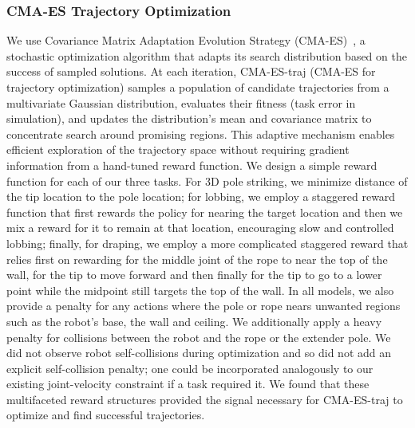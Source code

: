 \documentclass[conference]{IEEEtran}
\begin{document}
\subsubsection*{CMA-ES Trajectory Optimization}\label{sec:cmaes_traj}
We use Covariance Matrix Adaptation Evolution Strategy (CMA-ES)~\cite{cmaes}, a stochastic optimization algorithm that adapts its search distribution based on the success of sampled solutions. At each iteration, CMA-ES-traj (CMA-ES for trajectory optimization) samples a population of candidate trajectories from a multivariate Gaussian distribution, evaluates their fitness (task error in simulation), and updates the distribution's mean and covariance matrix to concentrate search around promising regions. This adaptive mechanism enables efficient exploration of the trajectory space without requiring gradient information from a hand-tuned reward function. We design a simple reward function for each of our three tasks. For 3D pole striking, we minimize distance of the tip location to the pole location; for lobbing, we employ a staggered reward function that first rewards the policy for nearing the target location and then we mix a reward for it to remain at that location, encouraging slow and controlled lobbing; finally, for draping, we employ a more complicated staggered reward that relies first on rewarding for the middle joint of the rope to near the top of the wall, for the tip to move forward and then finally for the tip to go to a lower point while the midpoint still targets the top of the wall. In all models, we also provide a penalty for any actions where the pole or rope nears unwanted regions such as the robot's base, the wall and ceiling. We additionally apply a heavy penalty for collisions between the robot and the rope or the extender pole. We did not observe robot self-collisions during optimization and so did not add an explicit self-collision penalty; one could be incorporated analogously to our existing joint-velocity constraint if a task required it. We found that these multifaceted reward structures provided the signal necessary for CMA-ES-traj to optimize and find successful trajectories. 
\end{document}
